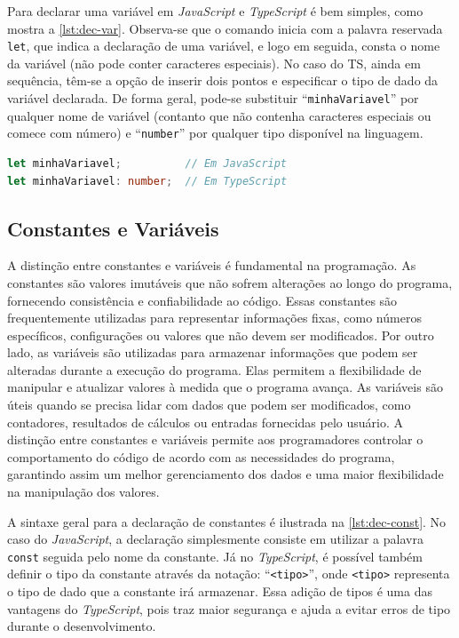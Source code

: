 Para declarar uma variável em \textit{JavaScript} e \textit{TypeScript} é bem simples, como mostra a \autoref{lst:dec-var}. Observa-se que o comando inicia com a palavra reservada \texttt{let}, que indica a declaração de uma variável, e logo em seguida, consta o nome da variável (não pode conter caracteres especiais). No caso do TS, ainda em sequência, têm-se a opção de inserir dois pontos e especificar o tipo de dado da variável declarada. De forma geral, pode-se substituir ``\texttt{minhaVariavel}'' por qualquer nome de variável (contanto que não contenha caracteres especiais ou comece com número) e ``\texttt{number}'' por qualquer tipo disponível na linguagem.

\begin{lstlisting}[language=TypeScript, label=lst:dec-var, caption=Exemplo de Declaração de Variável em JS e TS.]
let minhaVariavel;          // Em JavaScript   
let minhaVariavel: number;  // Em TypeScript
\end{lstlisting}



\subsection{Constantes e Variáveis}

A distinção entre constantes e variáveis é fundamental na programação. As constantes são valores imutáveis que não sofrem alterações ao longo do programa, fornecendo consistência e confiabilidade ao código. Essas constantes são frequentemente utilizadas para representar informações fixas, como números específicos, configurações ou valores que não devem ser modificados. Por outro lado, as variáveis são utilizadas para armazenar informações que podem ser alteradas durante a execução do programa. Elas permitem a flexibilidade de manipular e atualizar valores à medida que o programa avança. As variáveis são úteis quando se precisa lidar com dados que podem ser modificados, como contadores, resultados de cálculos ou entradas fornecidas pelo usuário. A distinção entre constantes e variáveis permite aos programadores controlar o comportamento do código de acordo com as necessidades do programa, garantindo assim um melhor gerenciamento dos dados e uma maior flexibilidade na manipulação dos valores.

A sintaxe geral para a declaração de constantes é ilustrada na \autoref{lst:dec-const}. No caso do \textit{JavaScript}, a declaração simplesmente consiste em utilizar a palavra \texttt{const} seguida pelo nome da constante. Já no \textit{TypeScript}, é possível também definir o tipo da constante através da notação: ``\texttt{<tipo>}'', onde \texttt{<tipo>} representa o tipo de dado que a constante irá armazenar. Essa adição de tipos é uma das vantagens do \textit{TypeScript}, pois traz maior segurança e ajuda a evitar erros de tipo durante o desenvolvimento.

